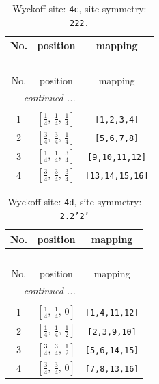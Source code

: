 \documentclass[fleqn,8pt]{jsarticle}
\begin{document}
\renewcommand{\arraystretch}{1.2}
\begin{longtable}{ccc}
\caption{Wyckoff site: {\tt 4c}, site symmetry: {\tt 222.}}
 \\
 \hline \hline
No. & position & mapping \\ \hline \endfirsthead

\multicolumn{2}{l}{\tablename\ \thetable{}} \\
 \hline \hline
No. & position & mapping \\ \hline \endhead

 \hline \hline
\multicolumn{2}{r}{\footnotesize\it continued ...} \\ \endfoot

 \hline \hline
\multicolumn{2}{r}{} \\ \endlastfoot

1 & $\left[ \frac{1}{4},\, \frac{1}{4},\, \frac{1}{4} \right]$ & {\tt [1,2,3,4]} \\ \hline
2 & $\left[ \frac{3}{4},\, \frac{3}{4},\, \frac{1}{4} \right]$ & {\tt [5,6,7,8]} \\ \hline
3 & $\left[ \frac{1}{4},\, \frac{1}{4},\, \frac{3}{4} \right]$ & {\tt [9,10,11,12]} \\ \hline
4 & $\left[ \frac{3}{4},\, \frac{3}{4},\, \frac{3}{4} \right]$ & {\tt [13,14,15,16]} \\
\end{longtable}
\renewcommand{\arraystretch}{1.2}
\begin{longtable}{ccc}
\caption{Wyckoff site: {\tt 4d}, site symmetry: {\tt 2.2'2'}}
 \\
 \hline \hline
No. & position & mapping \\ \hline \endfirsthead

\multicolumn{2}{l}{\tablename\ \thetable{}} \\
 \hline \hline
No. & position & mapping \\ \hline \endhead

 \hline \hline
\multicolumn{2}{r}{\footnotesize\it continued ...} \\ \endfoot

 \hline \hline
\multicolumn{2}{r}{} \\ \endlastfoot

1 & $\left[ \frac{1}{4},\, \frac{1}{4},\, 0 \right]$ & {\tt [1,4,11,12]} \\ \hline
2 & $\left[ \frac{1}{4},\, \frac{1}{4},\, \frac{1}{2} \right]$ & {\tt [2,3,9,10]} \\ \hline
3 & $\left[ \frac{3}{4},\, \frac{3}{4},\, \frac{1}{2} \right]$ & {\tt [5,6,14,15]} \\ \hline
4 & $\left[ \frac{3}{4},\, \frac{3}{4},\, 0 \right]$ & {\tt [7,8,13,16]} \\
\end{longtable}
\end{document}
